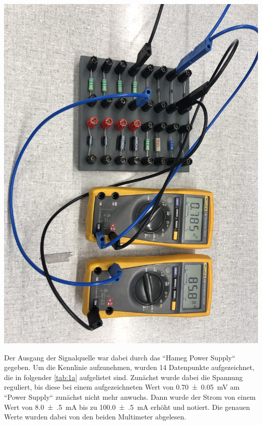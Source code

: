 \documentclass[11pt,ngerman]{scrartcl}
\begin{document}
\begin{center}
	\begin{minipage}[t]{0.7\textwidth}
		\includegraphics[width=\textwidth]{aufbau1a}
		\label{fig:aufbau1a}
	\end{minipage}
\end{center}

Der Ausgang der Signalquelle war dabei durch das ``Hameg Power Supply`` gegeben. Um die Kennlinie aufzunehmen, wurden 14 Datenpunkte aufgezeichnet, die in folgender \autoref{tab:1a} aufgelistet sind. Zunächst wurde dabei die Spannung reguliert, bis diese bei einem aufgezeichneten Wert von \SI{0.70(5)}{mV} am ``Power Supply`` zunächst nicht mehr anwuchs. Dann wurde der Strom von einem Wert von \SI{8.0(5)}{mA} bis zu \SI{100.0(5)}{mA} erhöht und notiert. Die genauen Werte wurden dabei von den beiden Multimeter abgelesen.
\end{document}
